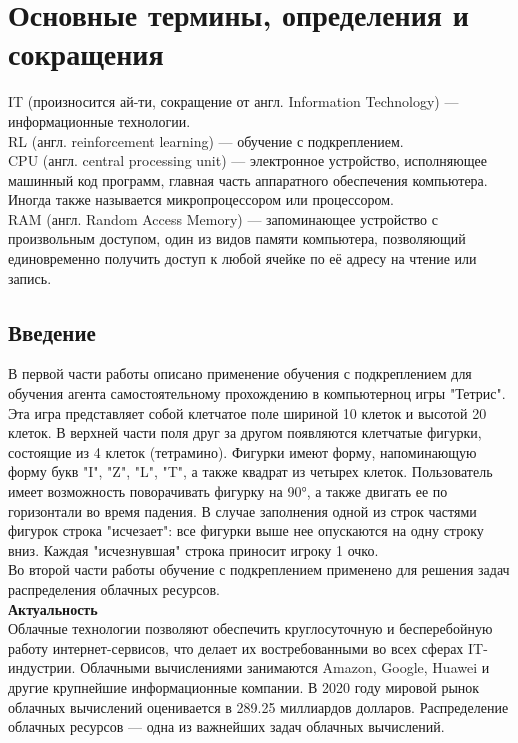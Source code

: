 \documentclass{article}
\begin{document}
\section {Основные термины, определения и сокращения}
IT (произносится ай-ти, сокращение от англ. Information Technology) — информационные технологии.\\
RL (англ. reinforcement learning) — обучение с подкреплением.\\
CPU (англ. central processing unit) — электронное устройство, исполняющее машинный код программ, главная часть аппаратного обеспечения компьютера. Иногда также называется микропроцессором или процессором.\\
RAM (англ. Random Access Memory) — запоминающее устройство с произвольным доступом, один из видов памяти компьютера, позволяющий единовременно получить доступ к любой ячейке по её адресу на чтение или запись.
\newpage
\begin{center}
\section {Введение}
\end{center}
В первой части работы описано применение обучения с подкреплением для обучения агента самостоятельному прохождению в компьютерноц игры "Тетрис"\cite{litlink1}. Эта игра представляет собой клетчатое поле шириной 10 клеток и высотой 20 клеток. В верхней части поля друг за другом появляются клетчатые фигурки, состоящие из 4 клеток (тетрамино). Фигурки имеют форму, напоминающую форму букв "I", "Z", "L", "T", а также квадрат из четырех клеток. Пользователь имеет возможность поворачивать фигурку на 90°, а также двигать ее по горизонтали во время падения. В случае заполнения одной из строк частями фигурок строка "исчезает": все фигурки выше нее опускаются на одну строку вниз. Каждая "исчезнувшая" строка приносит игроку 1 очко.\\
Во второй части работы обучение с подкреплением применено для решения задач распределения облачных ресурсов.\\
\textbf{Актуальность}\\
Облачные технологии позволяют обеспечить круглосуточную и бесперебойную работу интернет-сервисов, что делает их востребованными во всех сферах IT-индустрии. Облачными вычислениями занимаются Amazon, Google, Huawei и другие крупнейшие информационные компании\cite{litlink2}\cite{litlink3}. В 2020 году мировой рынок облачных вычислений оценивается в 289.25 миллиардов долларов\cite{litlink4}. Распределение облачных ресурсов — одна из важнейших задач облачных вычислений.\\
\end{document}
